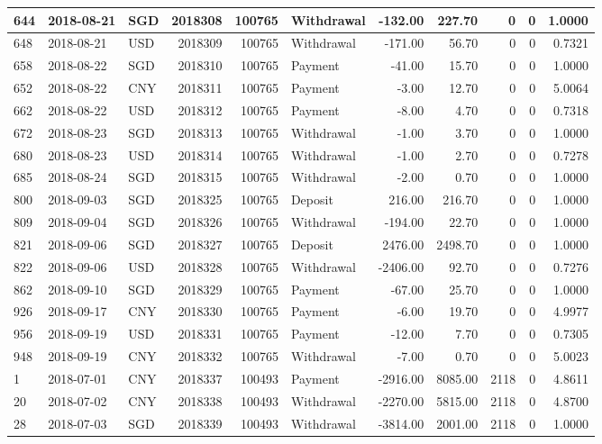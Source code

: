 \documentclass[]{article}
\begin{document}
\begin{table}[H]
\begin{tabular}{l|l|l|r|r|l|r|r|r|r|r}
\hline
644 & 2018-08-21 & SGD & 2018308 & 100765 & Withdrawal & -132.00 & 227.70 & 0 & 0 & 1.0000\\
\hline
648 & 2018-08-21 & USD & 2018309 & 100765 & Withdrawal & -171.00 & 56.70 & 0 & 0 & 0.7321\\
\hline
658 & 2018-08-22 & SGD & 2018310 & 100765 & Payment & -41.00 & 15.70 & 0 & 0 & 1.0000\\
\hline
652 & 2018-08-22 & CNY & 2018311 & 100765 & Payment & -3.00 & 12.70 & 0 & 0 & 5.0064\\
\hline
662 & 2018-08-22 & USD & 2018312 & 100765 & Payment & -8.00 & 4.70 & 0 & 0 & 0.7318\\
\hline
672 & 2018-08-23 & SGD & 2018313 & 100765 & Withdrawal & -1.00 & 3.70 & 0 & 0 & 1.0000\\
\hline
680 & 2018-08-23 & USD & 2018314 & 100765 & Withdrawal & -1.00 & 2.70 & 0 & 0 & 0.7278\\
\hline
685 & 2018-08-24 & SGD & 2018315 & 100765 & Withdrawal & -2.00 & 0.70 & 0 & 0 & 1.0000\\
\hline
800 & 2018-09-03 & SGD & 2018325 & 100765 & Deposit & 216.00 & 216.70 & 0 & 0 & 1.0000\\
\hline
809 & 2018-09-04 & SGD & 2018326 & 100765 & Withdrawal & -194.00 & 22.70 & 0 & 0 & 1.0000\\
\hline
821 & 2018-09-06 & SGD & 2018327 & 100765 & Deposit & 2476.00 & 2498.70 & 0 & 0 & 1.0000\\
\hline
822 & 2018-09-06 & USD & 2018328 & 100765 & Withdrawal & -2406.00 & 92.70 & 0 & 0 & 0.7276\\
\hline
862 & 2018-09-10 & SGD & 2018329 & 100765 & Payment & -67.00 & 25.70 & 0 & 0 & 1.0000\\
\hline
926 & 2018-09-17 & CNY & 2018330 & 100765 & Payment & -6.00 & 19.70 & 0 & 0 & 4.9977\\
\hline
956 & 2018-09-19 & USD & 2018331 & 100765 & Payment & -12.00 & 7.70 & 0 & 0 & 0.7305\\
\hline
948 & 2018-09-19 & CNY & 2018332 & 100765 & Withdrawal & -7.00 & 0.70 & 0 & 0 & 5.0023\\
\hline
1 & 2018-07-01 & CNY & 2018337 & 100493 & Payment & -2916.00 & 8085.00 & 2118 & 0 & 4.8611\\
\hline
20 & 2018-07-02 & CNY & 2018338 & 100493 & Withdrawal & -2270.00 & 5815.00 & 2118 & 0 & 4.8700\\
\hline
28 & 2018-07-03 & SGD & 2018339 & 100493 & Withdrawal & -3814.00 & 2001.00 & 2118 & 0 & 1.0000\\

\end{tabular}
\end{table}
\end{document}
